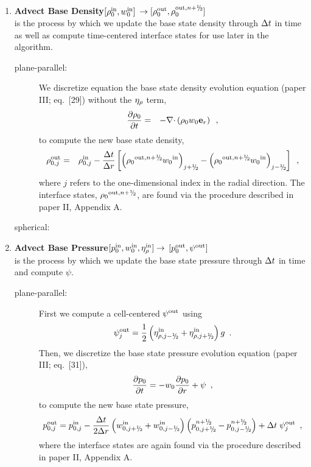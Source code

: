 \begin{enumerate}
\item {\bf Advect Base Density}$[\rho_0^{\mathrm{in}},w_0^{\mathrm{in}}]$
$\rightarrow [\rho_0^\outp,\rho_0^{\outp,n+\myhalf}]$\\
is the process by which we update the base state density through $\Delta t$ in time
as well as compute time-centered interface states for use later in the algorithm.
\begin{description}

\item[plane-parallel:] We discretize equation the base state density evolution 
equation (paper III; eq.~[29]) without the $\eta_{\rho}$ term,
\begin{eqnarray}
\frac{\partial \rho_0}{\partial t} &=& - \mathbf{\nabla} \mathbf{\cdot} \left( \rho_0 w_0 \mathbf{e}_r \right)
\enskip ,
\label{eq:rho0upd_new}
\end{eqnarray}
to compute the new base state density,
\begin{eqnarray}
\rho_{0,j}^{\outp} &=& \rho_{0,j}^{\inp} - \frac{\dt}{\dr} 
\left [ \left( {{\rho}_0}^{\outp,\nph} {w_0}^{\inp}\right)_{j+\myhalf} -  
         \left( {{\rho}_0}^{\outp,\nph} {w_0}^{\inp}\right)_{j-\myhalf} \right ]
         \nonumber \enskip,
\end{eqnarray}
where $j$ refers to the one-dimensional index in the radial direction.
The interface states, ${{\rho}_0}^{\outp,\nph}$, are found via the
procedure described in paper II, Appendix A.

\item[spherical:]

\end{description}

\item {\bf Advect Base Pressure}$[p_0^{\mathrm{in}},w_0^{\mathrm{in}},\eta_{\rho}^{\mathrm{in}}] \rightarrow$ 
$[p_0^{\mathrm{out}},\psi^{\mathrm{out}}]$\\
is the process by which we update the base state pressure through $\Delta t$ in time and
compute $\psi$.
\begin{description}

\item[plane-parallel:] First we compute a cell-centered $\psi^{\mathrm{out}}$ using
\begin{equation}
 \psi_j^\outp = \frac{1}{2} \left(\eta_{\rho,j-\myhalf}^\inp + \eta_{\rho,j+\myhalf}^\inp\right) g \enskip .
\end{equation}
Then, we discretize the base state pressure evolution equation (paper III; eq.~[31]),
\begin{equation}
\frac{\partial p_0}{\partial t} = 
-w_0 \frac{\partial p_0}{\partial r} + \psi \enskip ,
\label{eq:p0upd_new}
\end{equation}
to compute the new base state pressure,
\begin{equation}
p_{0,j}^\outp = p_{0,j}^\inp - \frac{\dt}{2\dr} \left (w_{0,j+\myhalf}^\inp
+ w_{0,j-\myhalf}^\inp \right)
\left (p_{0,j+\myhalf}^{n+\myhalf} -p_{0,j-\myhalf}^{n+\myhalf} \right ) + \dt \; \psi_j^\outp 
\enskip,
\end{equation}
where the interface states are again found via the procedure described
in paper II, Appendix A.


\end{description}
\end{enumerate}

